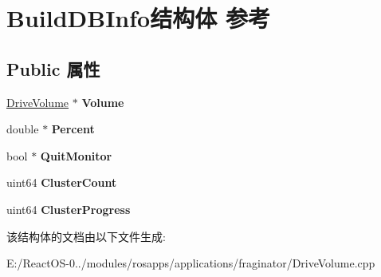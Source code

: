 \hypertarget{struct_build_d_b_info}{}\section{Build\+D\+B\+Info结构体 参考}
\label{struct_build_d_b_info}
\subsection*{Public 属性}
\begin{DoxyCompactItemize}
\item 
\mbox{\label{struct_build_d_b_info_a8f57a60ba7a4bcbf481955345f91b459}} 
\hyperlink{class_drive_volume}{Drive\+Volume} $\ast$ {\bfseries Volume}
\item 
\mbox{\label{struct_build_d_b_info_ace131bcc27f63ff2e97ec2255388a7ad}} 
double $\ast$ {\bfseries Percent}
\item 
\mbox{\label{struct_build_d_b_info_aef14929c9bc9691e78c255a2bbaf489f}} 
bool $\ast$ {\bfseries Quit\+Monitor}
\item 
\mbox{\label{struct_build_d_b_info_aef598bfc77a8c06855e33dd1f6b7047c}} 
uint64 {\bfseries Cluster\+Count}
\item 
\mbox{\label{struct_build_d_b_info_a4ab6f161933239478c2edef7551df796}} 
uint64 {\bfseries Cluster\+Progress}
\end{DoxyCompactItemize}


该结构体的文档由以下文件生成\+:\begin{DoxyCompactItemize}
\item 
E\+:/\+React\+O\+S-\/0../modules/rosapps/applications/fraginator/Drive\+Volume.\+cpp\end{DoxyCompactItemize}
